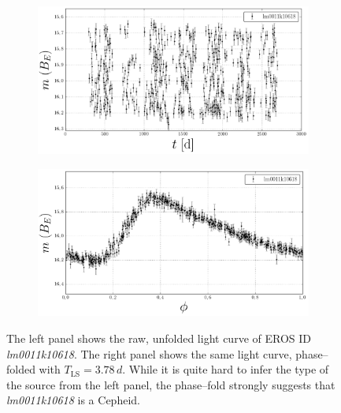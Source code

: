 \begin{figure}[h]
	\centering
	\begin{subfigure}[t]{0.49\textwidth}
		\centering
		\label{fig:lightcurve-unfolded}
		\includegraphics[width=\textwidth]{figures/time-series/lm0011k10618.png}
	\end{subfigure}
	\begin{subfigure}[t]{0.49\textwidth}
		\centering
		\label{fig:lightcurve-folded}
		\includegraphics[width=\textwidth]{figures/time-series/lm0011k10618-folded.png}
	\end{subfigure}
	\caption[Raw and phase--folded light curves for EROS ID \emph{lm0011k10618}]{The left panel shows the raw, unfolded light curve of EROS ID \emph{lm0011k10618}. The right panel shows the same light curve, phase--folded with $T_{\text{LS}} = 3.78 \, \unit{d}$. While it is quite hard to infer the type of the source from the left panel, the phase--fold strongly suggests that \emph{lm0011k10618} is a Cepheid.}
	\label{fig:unfolded-folded-light-curve}
\end{figure}

